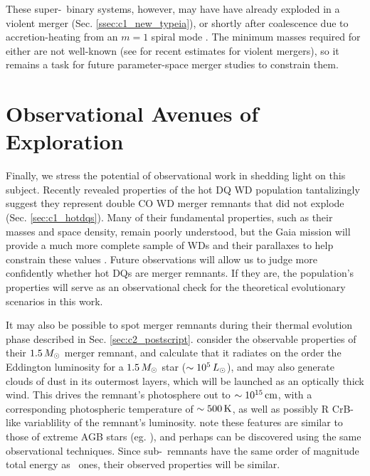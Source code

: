 These super-\Mch\ binary systems, however, may have have already exploded in a violent merger (Sec. \ref{ssec:c1_new_typeia}), or shortly after coalescence due to accretion-heating from an $m = 1$ spiral mode \citep{kash+15}.  The minimum masses required for either are not well-known (see \citealt{dan+12, sato+16} for recent estimates for violent mergers), so it remains a task for future parameter-space merger studies to constrain them.
 
\section{Observational Avenues of Exploration}

Finally, we stress the potential of observational work in shedding light on this subject.  Recently revealed properties of the hot DQ WD population tantalizingly suggest they represent double CO WD merger remnants that did not explode (Sec. \ref{sec:c1_hotdqs}).  Many of their fundamental properties, such as their masses and space density, remain poorly understood, but the Gaia mission will provide a much more complete sample of WDs and their parallaxes to help constrain these values \citep{dunl15thesis}.  Future observations will allow us to judge more confidently whether hot DQs are merger remnants.  If they are, the population's properties will serve as an observational check for the theoretical evolutionary scenarios in this work.

It may also be possible to spot merger remnants during their thermal evolution phase described in Sec. \ref{sec:c2_postscript}.  \cite{schw+16} consider the observable properties of their $1.5\,\Msun$ merger remnant, and calculate that it radiates on the order the Eddington luminosity for a $1.5\,\Msun$ star ($\sim10^5\,\Lsun$), and may also generate clouds of dust in its outermost layers, which will be launched as an optically thick wind.  This drives the remnant's photosphere out to $\sim10^{15}\,\mathrm{cm}$, with a corresponding photospheric temperature of $\sim500\,\mathrm{K}$, as well as possibly R CrB-like variablility of the remnant's luminosity.  \cite{schw+16} note these features are similar to those of extreme AGB stars (eg. \citealt{blum+06}), and perhaps can be discovered using the same observational techniques.  Since sub-\Mch\ remnants have the same order of magnitude total energy as \Mch\ ones, their observed properties will be similar.

